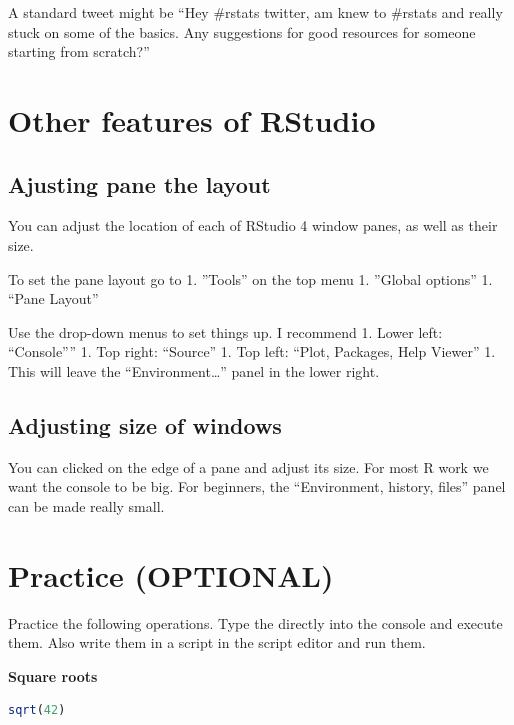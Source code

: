 \documentclass[
]{book}
\begin{document}
A standard tweet might be
``Hey \#rstats twitter, am knew to \#rstats and really stuck on some of the basics. Any suggestions for good resources for someone starting from scratch?''

\hypertarget{other-features-of-rstudio}{%
\section{Other features of RStudio}\label{other-features-of-rstudio}}

\hypertarget{ajusting-pane-the-layout}{%
\subsection{Ajusting pane the layout}\label{ajusting-pane-the-layout}}

You can adjust the location of each of RStudio 4 window panes, as well as their size.

To set the pane layout go to
1. ''Tools'' on the top menu
1. ''Global options''
1. ``Pane Layout''

Use the drop-down menus to set things up. I recommend
1. Lower left: ``Console''''
1. Top right: ``Source''
1. Top left: ``Plot, Packages, Help Viewer''
1. This will leave the ``Environment\ldots{}'' panel in the lower right.

\hypertarget{adjusting-size-of-windows}{%
\subsection{Adjusting size of windows}\label{adjusting-size-of-windows}}

You can clicked on the edge of a pane and adjust its size. For most R work we want the console to be big. For beginners, the ``Environment, history, files'' panel can be made really small.

\hypertarget{practice-optional}{%
\section{Practice (OPTIONAL)}\label{practice-optional}}

Practice the following operations. Type the directly into the console and execute them. Also write them in a script in the script editor and run them.

\textbf{Square roots}

\begin{lstlisting}[language=R]
sqrt(42)
\end{lstlisting}
\end{document}
